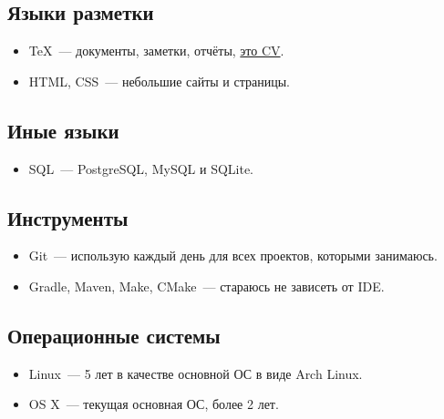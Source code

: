     \subsection*{Языки разметки}

      \begin{itemize}

        \item \TeX~--- документы, заметки, отчёты, \href{https://github.com/ming13/cv/}{это CV}.

        \item HTML, CSS~--- небольшие сайты и страницы.

      \end{itemize}

    \subsection*{Иные языки}

      \begin{itemize}

        \item SQL~--- PostgreSQL, MySQL и SQLite.

      \end{itemize}

    \subsection*{Инструменты}

      \begin{itemize}

        \item Git~--- использую каждый день для всех проектов, которыми занимаюсь.

        \item Gradle, Maven, Make, CMake~--- стараюсь не зависеть от IDE.

      \end{itemize}

    \subsection*{Операционные системы}

      \begin{itemize}

        \item Linux~--- 5 лет в качестве основной ОС в виде Arch Linux.

        \item OS X~--- текущая основная ОС, более 2 лет.

      \end{itemize}


